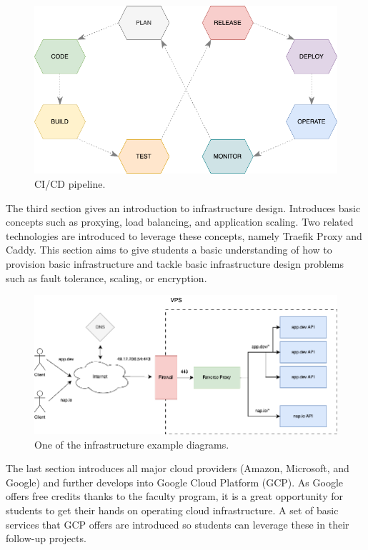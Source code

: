 \documentclass[
  digital,
  color,
  oneside,
  nosansbold,
  nocolorbold,
  lof,
  lot,
]{fithesis4}
\begin{document}
\begin{figure}[H]
    \centering
    \includegraphics[width=12cm]{figures/cicd.png}
    \caption{CI/CD pipeline.}
\end{figure}

The third section gives an introduction to infrastructure design. Introduces basic concepts such as proxying, load balancing, and application scaling. Two related technologies are introduced to leverage these concepts, namely Traefik Proxy and Caddy. This section aims to give students a basic understanding of how to provision basic infrastructure and tackle basic infrastructure design problems such as fault tolerance, scaling, or encryption.

\begin{figure}[H]
    \centering
    \includegraphics[width=12cm]{figures/infrastructure.png}
    \caption{One of the infrastructure example diagrams.}
\end{figure}

The last section introduces all major cloud providers (Amazon, Microsoft, and Google) and further develops into Google Cloud Platform (GCP). As Google offers free credits thanks to the faculty program, it is a great opportunity for students to get their hands on operating cloud infrastructure. A set of basic services that GCP offers are introduced so students can leverage these in their follow-up projects.
\end{document}
